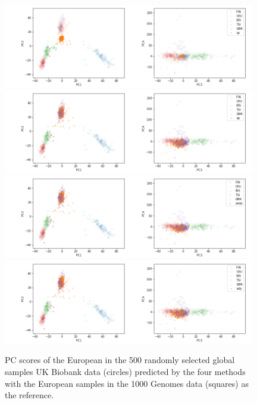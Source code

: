 \documentclass{article}
\begin{document}
\begin{figure}[p]
  \centering
  \includegraphics[width=0.98\textwidth]{img/ukb_snpscap_kgn_bial_orphans_5c_pred_EUR_sturef_kgn_bial_orphans_snps_ukb_snpscap_ukb_EUR_sp}
  \includegraphics[width=0.98\textwidth]{img/ukb_snpscap_kgn_bial_orphans_5c_pred_EUR_sturef_kgn_bial_orphans_snps_ukb_snpscap_ukb_EUR_ap}
  \includegraphics[width=0.98\textwidth]{img/ukb_snpscap_kgn_bial_orphans_5c_pred_EUR_sturef_kgn_bial_orphans_snps_ukb_snpscap_ukb_EUR_oadp}
  \includegraphics[width=0.98\textwidth]{img/ukb_snpscap_kgn_bial_orphans_5c_pred_EUR_sturef_kgn_bial_orphans_snps_ukb_snpscap_ukb_EUR_adp}
  \caption{PC scores of the European in the 500 randomly selected global samples UK Biobank data (circles) predicted by the four methods with the European samples in the 1000 Genomes data (squares) as the reference.}
  \label{fig:ukb_500_eur}
\end{figure}
\end{document}
